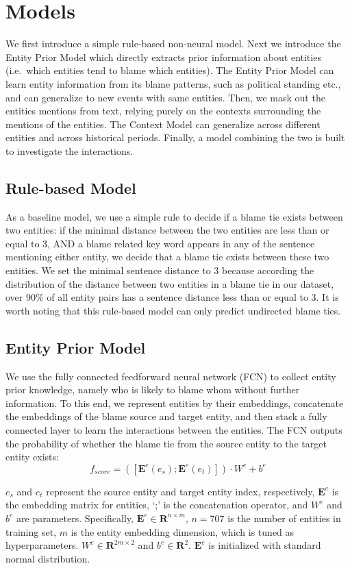 \documentclass[letterpaper]{article}
\begin{document}
\section{Models}

We first introduce a simple rule-based non-neural model. Next we introduce the Entity Prior Model which directly extracts prior information about entities (i.e.\ which entities tend to blame which entities). The Entity Prior Model can learn entity information from its blame patterns, such as political standing etc., and can generalize to new events with same entities. Then, we mask out the entities mentions from text, relying purely on the contexts surrounding the mentions of the entities. The Context Model can generalize across different entities and across historical periods. Finally, a model combining the two is built to investigate the interactions.

\subsection{Rule-based Model}
As a baseline model, we use a simple rule to decide if a blame tie exists between two entities: if the minimal distance between the two entities are less than or equal to 3, AND a blame related key word appears in any of the sentence mentioning either entity, we decide that a blame tie exists between these two entities. We set the minimal sentence distance to 3 because according the distribution of the distance between two entities in a blame tie in our dataset, over 90\% of all entity pairs has a sentence distance less than or equal to 3. It is worth noting that this rule-based model can only predict undirected blame ties.

\subsection{Entity Prior Model}
\label{entitymodel}
We use the fully connected feedforward neural network (FCN) to collect entity prior knowledge, namely who is likely to blame whom without further information. To this end, we represent entities by their embeddings, concatenate the embeddings of the blame source and target entity, and then stack a fully connected layer to learn the interactions between the entities. The FCN outputs the probability of whether the blame tie from the source entity to the target entity exists: $$f_{score} = ([\mathbf{E}^e(e_s); \mathbf{E}^e(e_t)]) \cdot W^e + b^e $$

$e_s$ and $e_t$ represent the source entity and target entity index, respectively, $\mathbf{E}^e$ is the embedding matrix for entities, `;' is the concatenation operator, and $W^e$ and $b^e$ are parameters. Specifically, $\mathbf{E}^e \in \mathbf{R}^{n\times m}$, $n=707$ is the number of entities in training set, $m$ is the entity embedding dimension, which is tuned as hyperparameters. $W^e \in \mathbf{R}^{2m\times 2}$ and $b^e \in \mathbf{R}^{2} $. $\mathbf{E}^e$ is initialized with standard normal distribution.
\end{document}
